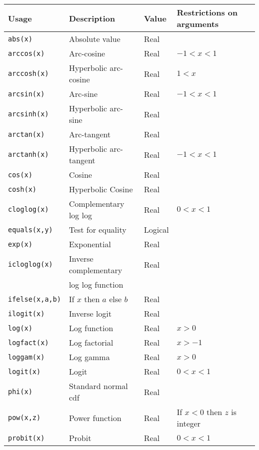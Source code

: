 \documentclass[11pt, a4paper, titlepage]{report}
\begin{document}
\begin{table}
\begin{center}
\begin{tabular}{llll}
\hline
Usage  & Description & Value & Restrictions on arguments \\ 
\hline
\verb+abs(x)+       & Absolute value        & Real & \\
\verb+arccos(x)+    & Arc-cosine            & Real & $-1 < x < 1$\\
\verb+arccosh(x)+   & Hyperbolic arc-cosine & Real & $1 < x$ \\
\verb+arcsin(x)+    & Arc-sine              & Real & $-1 < x < 1$\\
\verb+arcsinh(x)+   & Hyperbolic arc-sine   & Real &\\
\verb+arctan(x)+    & Arc-tangent           & Real &\\
\verb+arctanh(x)+   & Hyperbolic arc-tangent & Real & $-1 < x < 1$\\
\verb+cos(x)+       & Cosine              & Real & \\
\verb+cosh(x)+      & Hyperbolic Cosine   & Real & \\
\verb+cloglog(x)+    & Complementary log log & Real & $0 < x < 1$ \\
\verb+equals(x,y)+   & Test for equality   & Logical & \\
\verb+exp(x)+       & Exponential         & Real & \\
\verb+icloglog(x)+  & Inverse complementary & Real & \\
                    & log log function    & \\
\verb+ifelse(x,a,b)+ & If $x$ then $a$ else $b$ & Real & \\
\verb+ilogit(x)+    & Inverse logit       & Real & \\
\verb+log(x)+       & Log function        & Real & $x > 0$ \\
\verb+logfact(x)+   & Log factorial       & Real & $x > -1$ \\
\verb+loggam(x)+    & Log gamma           & Real & $x > 0$ \\
\verb+logit(x)+     & Logit               & Real & $0 < x < 1$ \\
\verb+phi(x)+       & Standard normal cdf & Real & \\
\verb+pow(x,z)+     & Power function      & Real & If $x < 0$ then $z$ is integer \\ 
\verb+probit(x)+    & Probit              & Real & $0 < x < 1$ \\

\end{tabular}
\end{center}
\end{table}
\end{document}
